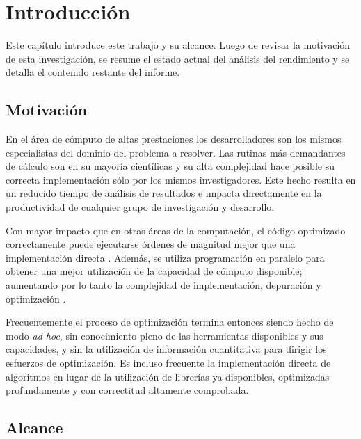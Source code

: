 \documentclass[a4paper]{report}
\begin{document}
\tableofcontents

\chapter{Introducci\'on}

Este cap\'itulo introduce este trabajo y su alcance. Luego de revisar la
motivaci\'on de esta investigaci\'on, se resume el estado actual del an\'alisis
del rendimiento y se detalla el contenido restante del informe.

\section{Motivaci\'on}

En el \'area de c\'omputo de altas prestaciones los desarrolladores son los mismos
especialistas del dominio del problema a resolver. Las rutinas
m\'as demandantes de c\'alculo son en su mayor\'ia cient\'ificas y su
alta complejidad hace posible su correcta implementaci\'on s\'{o}lo por los mismos investigadores.
Este hecho resulta en un reducido tiempo de an\'alisis de resultados
e impacta directamente en la productividad de cualquier grupo de investigaci\'on y
desarrollo.

\bigskip

Con mayor impacto que en otras \'areas de la computaci\'on, el c\'odigo
optimizado correctamente puede ejecutarse \'ordenes de magnitud mejor que una implementaci\'on
directa \cite{mm-matrixmultiplicationtool}. Adem\'as, se utiliza
programaci\'on en paralelo para obtener una mejor utilizaci\'on de la
capacidad de c\'omputo disponible; aumentando por lo tanto la complejidad de
implementaci\'on, depuraci\'on y optimizaci\'on \cite{parallel-programming}.

\bigskip

Frecuentemente el proceso de optimizaci\'on termina entonces siendo
hecho de modo {\it ad-hoc}, sin conocimiento pleno de las herramientas disponibles y
sus capacidades, y sin la utilizaci\'on de informaci\'on cuantitativa para dirigir los
esfuerzos de optimizaci\'on. Es incluso frecuente la implementaci\'on directa
de algoritmos en lugar de la utilizaci\'on de librer\'ias ya disponibles, optimizadas
profundamente y con correctitud altamente comprobada.

\section{Alcance}
\end{document}
